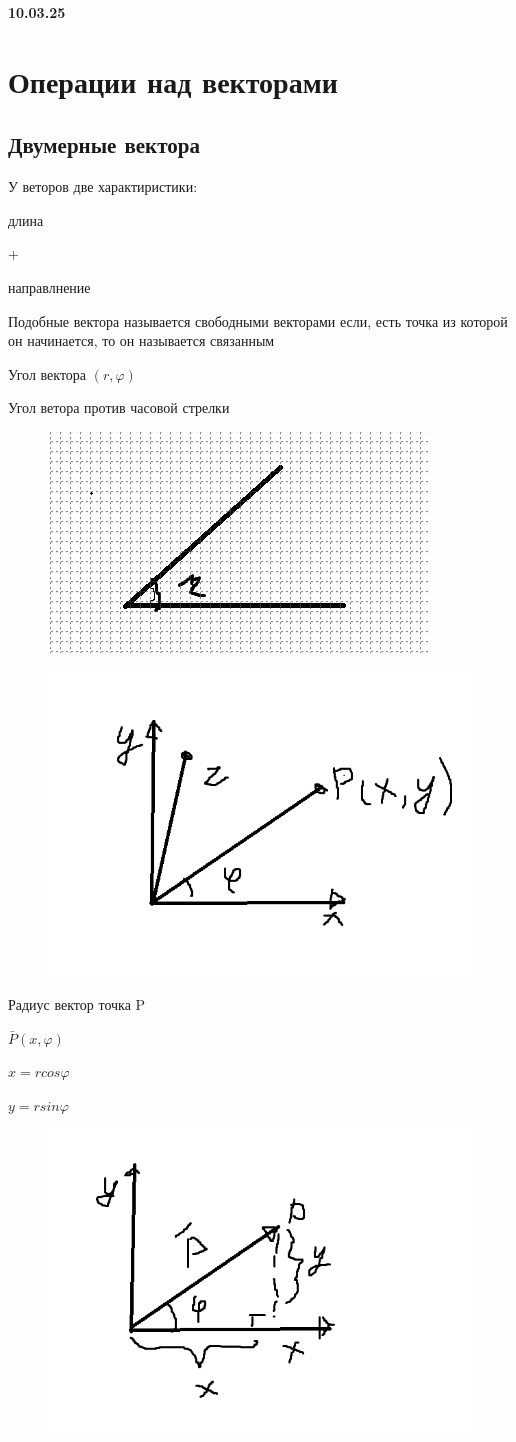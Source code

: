 \documentclass{article}
\begin{document}
\textbf{10.03.25}

\section{Операции над векторами}
\subsection{Двумерные вектора}
У веторов две характиристики:

длина

+

направлнение

Подобные вектора называется свободными векторами
если, есть точка из которой он начинается, 
то он называется связанным

Угол вектора $(r,\varphi)$

Угол ветора против часовой стрелки

\begin{figure} [H]
    \includegraphics[width=0.50\linewidth]{Снимок экрана 2025-03-10 121857.png}
\end{figure}




\begin{figure} [H]
    \includegraphics[width=0.50\linewidth]{4.png}
\end{figure}
Радиус вектор точка P

$\bar{P} (x,\varphi)$

$x = r cos \varphi$

$y = r sin \varphi$




\begin{figure} [H]
    \includegraphics[width=0.50\linewidth]{5.png}
\end{figure}
\end{document}
